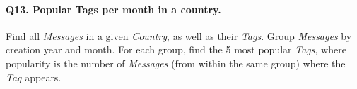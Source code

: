 \paragraph{\textbf{Q13}. Popular Tags per month in a country.}
Find all \emph{Messages} in a given \emph{Country}, as well as their
\emph{Tags}.
Group \emph{Messages} by creation year and month. For each group, find
the 5 most popular \emph{Tags}, where popularity is the number of
\emph{Messages} (from within the same group) where the \emph{Tag}
appears.
